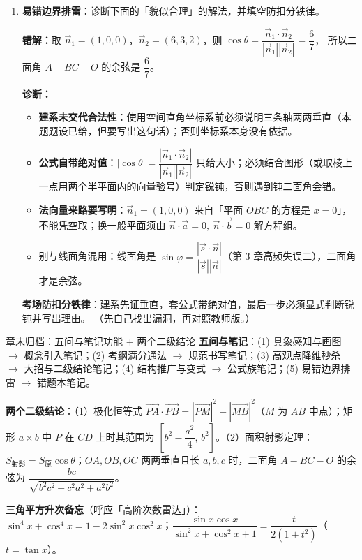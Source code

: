 \begin{tcolorbox}
\begin{enumerate}[label=(\arabic*), itemsep=4pt]
\item \textbf{易错边界排雷}：诊断下面的「貌似合理」的解法，并填空防扣分铁律。

{\bfseries\color{red!70!black}错解：}取 $\vec n_1=(1,0,0)$，$\vec n_2=(6,3,2)$，则
$\cos\theta=\dfrac{\vec n_1\cdot\vec n_2}{|\vec n_1||\vec n_2|}=\dfrac67$，
所以二面角 $A-BC-O$ 的余弦是 $\dfrac67$。

\ifteacher
{\bfseries\color{main}诊断：}
\begin{itemize}[itemsep=1pt]
\item \textbf{建系未交代合法性}：使用空间直角坐标系前必须说明三条轴两两垂直（本题题设已给，但要写出这句话）；否则坐标系本身没有依据。
\item \textbf{公式自带绝对值}：$|\cos\theta|=\dfrac{|\vec n_1\cdot\vec n_2|}{|\vec n_1||\vec n_2|}$ 只给大小；必须结合图形（或取棱上一点用两个半平面内的向量验号）判定锐钝，否则遇到钝二面角会错。
\item \textbf{法向量来路要写明}：$\vec n_1=(1,0,0)$ 来自「平面 $OBC$ 的方程是 $x=0$」，不能凭空取；换一般平面须由 $\vec n\cdot\vec a=0,\ \vec n\cdot\vec b=0$ 解方程组。
\item 别与线面角混用：线面角是 $\sin\varphi=\dfrac{|\vec s\cdot\vec n|}{|\vec s||\vec n|}$（第 3 章高频失误二），二面角才是余弦。
\end{itemize}

\textbf{考场防扣分铁律}：建系先证垂直，套公式带绝对值，最后一步必须显式判断锐钝并写出理由。
\else
{\small（先自己找出漏洞，再对照教师版。）}
\fi
\end{enumerate}
\end{tcolorbox}


\begin{notezone}{章末归档：五问与笔记功能 + 两个二级结论}
\textbf{五问与笔记}：(1) 具象感知与画图 $\to$ 概念引入笔记；(2) 考纲满分通法 $\to$ 规范书写笔记；(3) 高观点降维秒杀 $\to$ 大招与二级结论笔记；(4) 结构推广与变式 $\to$ 公式族笔记；(5) 易错边界排雷 $\to$ 错题本笔记。

\textbf{两个二级结论}：（1）极化恒等式 $\overrightarrow{PA}\cdot\overrightarrow{PB}=|\overrightarrow{PM}|^2-|\overrightarrow{MB}|^2$（$M$ 为 $AB$ 中点）；矩形 $a\times b$ 中 $P$ 在 $CD$ 上时其范围为 $\left[b^2-\dfrac{a^2}{4},\,b^2\right]$。（2）面积射影定理：$S_{\text{射影}}=S_{\text{原}}\cos\theta$；$OA,OB,OC$ 两两垂直且长 $a,b,c$ 时，二面角 $A-BC-O$ 的余弦为 $\dfrac{bc}{\sqrt{b^2c^2+c^2a^2+a^2b^2}}$。

\textbf{三角平方升次备忘}（呼应「高阶次数雷达」）：$\sin^4x+\cos^4x=1-2\sin^2x\cos^2x$；$\dfrac{\sin x\cos x}{\sin^2x+\cos^2x+1}=\dfrac{t}{2(1+t^2)}$（$t=\tan x$）。
\end{notezone}
